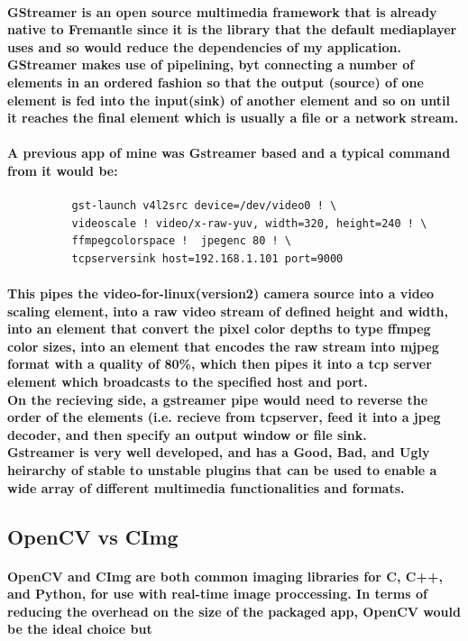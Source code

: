 \documentclass[11pt]{article} %
\begin{document}
\paragraph{GStreamer is an open source multimedia framework that is already native to Fremantle since it is the library that the default mediaplayer uses and so would reduce the dependencies of my application. GStreamer makes use of pipelining, byt connecting a number of elements in an ordered fashion so that the output (source) of one element is fed into the input(sink) of another element and so on until it reaches the final element which is usually a file or a network stream.
\\\\A previous app of mine was Gstreamer based and a typical command from it would be:
}
\begin{verbatim}
	      gst-launch v4l2src device=/dev/video0 ! \
	      videoscale ! video/x-raw-yuv, width=320, height=240 ! \
	      ffmpegcolorspace !  jpegenc 80 ! \
	      tcpserversink host=192.168.1.101 port=9000
\end{verbatim}
\paragraph{This pipes the video-for-linux(version2) camera source into a video scaling element, into a raw video stream of defined height and width, into an element that convert the pixel color depths to type ffmpeg color sizes, into an element that encodes the raw stream into mjpeg format with a quality of 80\%, which then pipes it into a tcp server element which broadcasts to the specified host and port.
\\On the recieving side, a gstreamer pipe would need to reverse the order of the elements (i.e. recieve from tcpserver, feed it into a jpeg decoder, and then specify an output window or file sink.
\\Gstreamer is very well developed, and has a Good, Bad, and Ugly heirarchy of stable to unstable plugins that can be used to enable a wide array of different multimedia functionalities and formats.
}


\subsection{OpenCV vs CImg}
\paragraph{OpenCV and CImg are both common imaging libraries for C, C++, and Python, for use with real-time image proccessing. In terms of reducing the overhead on the size of the packaged app, OpenCV would be the ideal choice but}
\end{document}
